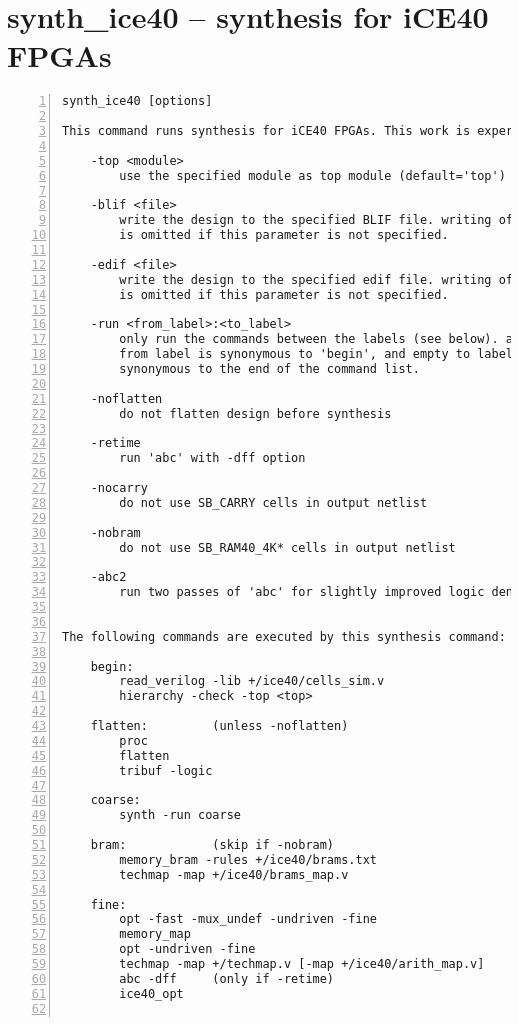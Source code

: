 \section{synth\_ice40 -- synthesis for iCE40 FPGAs}
\label{cmd:synth_ice40}
\begin{lstlisting}[numbers=left,frame=single]
    synth_ice40 [options]

This command runs synthesis for iCE40 FPGAs. This work is experimental.

    -top <module>
        use the specified module as top module (default='top')

    -blif <file>
        write the design to the specified BLIF file. writing of an output file
        is omitted if this parameter is not specified.

    -edif <file>
        write the design to the specified edif file. writing of an output file
        is omitted if this parameter is not specified.

    -run <from_label>:<to_label>
        only run the commands between the labels (see below). an empty
        from label is synonymous to 'begin', and empty to label is
        synonymous to the end of the command list.

    -noflatten
        do not flatten design before synthesis

    -retime
        run 'abc' with -dff option

    -nocarry
        do not use SB_CARRY cells in output netlist

    -nobram
        do not use SB_RAM40_4K* cells in output netlist

    -abc2
        run two passes of 'abc' for slightly improved logic density


The following commands are executed by this synthesis command:

    begin:
        read_verilog -lib +/ice40/cells_sim.v
        hierarchy -check -top <top>

    flatten:         (unless -noflatten)
        proc
        flatten
        tribuf -logic

    coarse:
        synth -run coarse

    bram:            (skip if -nobram)
        memory_bram -rules +/ice40/brams.txt
        techmap -map +/ice40/brams_map.v

    fine:
        opt -fast -mux_undef -undriven -fine
        memory_map
        opt -undriven -fine
        techmap -map +/techmap.v [-map +/ice40/arith_map.v]
        abc -dff     (only if -retime)
        ice40_opt


\end{lstlisting}
